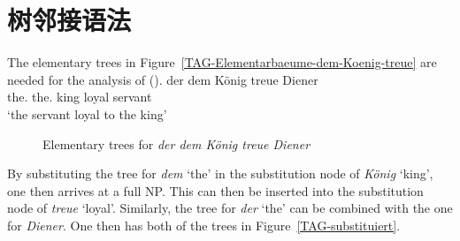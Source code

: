 \section{树邻接语法}

The elementary trees in Figure~\vref{TAG-Elementarbaeume-dem-Koenig-treue} are needed for the analysis of ().
\ea
\gll der        dem        König treue Diener\\
     the.\nom{} the.\dat{} king  loyal servant\\
\glt `the servant loyal to the king'
\z

\begin{figure}
\hfill
{}
\hfill
{}
\hfill
{}
%
\hfill
%
%
\hfill
%
\hfill\mbox{}
\caption{\label{TAG-Elementarbaeume-dem-Koenig-treue}Elementary trees for \emph{der dem König treue Diener}}
\end{figure}%

\noindent
By substituting the tree for \emph{dem} `the' in the substitution node of \emph{König} `king', one then arrives at a full NP.
This can then be inserted into the substitution node of \emph{treue} `loyal'. Similarly, the tree
for \emph{der} `the' can be combined with the one for \emph{Diener}. One then has both of the trees in Figure~\vref{TAG-substituiert}.

